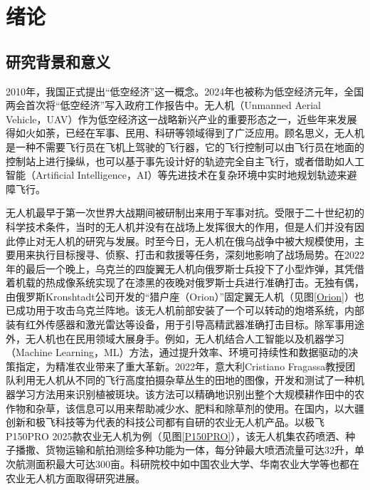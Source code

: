 \chapter{绪论}
%
\section{研究背景和意义}
%
2010年，我国正式提出“低空经济”这一概念。2024年也被称为低空经济元年，全国两会首次将“低空经济”写入政府工作报告中。无人机（Unmanned Aerial Vehicle，UAV）作为低空经济这一战略新兴产业的重要形态之一，近些年来发展得如火如荼，已经在军事、民用、科研等领域得到了广泛应用。顾名思义，无人机是一种不需要飞行员在飞机上驾驶的飞行器，它的飞行控制可以由飞行员在地面的控制站上进行操纵，也可以基于事先设计好的轨迹完全自主飞行，或者借助如人工智能（Artificial Intelligence，AI）等先进技术在复杂环境中实时地规划轨迹来避障飞行\cite{rezwanArtificialIntelligenceApproaches2022}。

无人机最早于第一次世界大战期间被研制出来用于军事对抗。受限于二十世纪初的科学技术条件，当时的无人机并没有在战场上发挥很大的作用，但是人们并没有因此停止对无人机的研究与发展。时至今日，无人机在俄乌战争中被大规模使用，主要用来执行目标搜寻、侦察、打击和救援等任务，深刻地影响了战场局势。在2022年的最后一个晚上，乌克兰的四旋翼无人机向俄罗斯士兵投下了小型炸弹，其凭借着机载的热成像系统实现了在漆黑的夜晚对俄罗斯士兵进行准确打击\cite{kunertovaWarUkraineShows2023}。无独有偶，由俄罗斯Kronshtadt公司开发的“猎户座（Orion）”固定翼无人机（见图\ref{Orion}）也已成功用于攻击乌克兰阵地。该无人机前部安装了一个可以转动的炮塔系统，内部装有红外传感器和激光雷达等设备，用于引导高精武器准确打击目标。除军事用途外，无人机也在民用领域大展身手。例如，无人机结合人工智能以及机器学习（Machine Learning，ML）方法，通过提升效率、环境可持续性和数据驱动的决策指定，为精准农业带来了重大革新\cite{agrawal2024transforming}。2022年，意大利Cristiano Fragassa教授团队利用无人机从不同的飞行高度拍摄杂草丛生的田地的图像，开发和测试了一种机器学习方法用来识别植被斑块。该方法可以精确地识别出整个大规模耕作田中的农作物和杂草，该信息可以用来帮助减少水、肥料和除草剂的使用\cite{fragassaNewProcedureCombining2023}。在国内，以大疆创新和极飞科技等为代表的科技公司都有自研的农业无人机产品。以极飞P150PRO 2025款农业无人机为例（见图\ref{P150PRO}），该无人机集农药喷洒、种子播撒、货物运输和航拍测绘多种功能为一体，每分钟最大喷洒流量可达32升，单次航测面积最大可达300亩。科研院校中如中国农业大学、华南农业大学\cite{liuAgriculturalUAVObstacle2024a}等也都在农业无人机方面取得研究进展。

